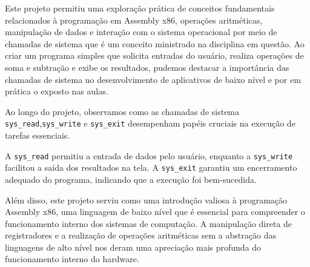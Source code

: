 \documentclass[
	12pt,				%
	openright,			%
	oneside,			%
	a4paper,			%
	chapter=TITLE,		%
	english,			%
	french,				%
	spanish,			%
	brazil				%
	]{abntex2}
\theoremstyle{definition}
\begin{document}
Este projeto permitiu uma exploração prática de conceitos fundamentais relacionados à programação em Assembly x86, operações 
aritméticas, manipulação de dados e interação com o sistema operacional por meio de chamadas de sistema que é um conceito ministrado na disciplina em questão. 
Ao criar um programa simples que solicita
entradas do usuário, realiza operações de soma e subtração e exibe os resultados, pudemos destacar a importância das chamadas de sistema no 
desenvolvimento de aplicativos de baixo nível e por em prática o exposto nas aulas.

Ao longo do projeto, observamos como as chamadas de sistema 
\texttt{sys\_read},\texttt{sys\_write} e \texttt{sys\_exit}
desempenham papéis cruciais na execução de tarefas essenciais.
 
A \texttt{sys\_read} permitiu a entrada de dados pelo usuário, enquanto a \texttt{sys\_write} 
facilitou a saída dos resultados na tela. A \texttt{sys\_exit} garantiu um encerramento 
adequado do programa, indicando que a execução foi bem-sucedida.

Além disso, este projeto serviu como uma introdução valiosa à programação Assembly x86, uma 
linguagem de baixo nível que é essencial para compreender o funcionamento interno dos sistemas de 
computação. A manipulação direta de registradores e a realização de operações aritméticas sem a 
abstração das linguagens de alto nível nos deram uma apreciação mais profunda do funcionamento interno do hardware.


\postextual

\end{document}
